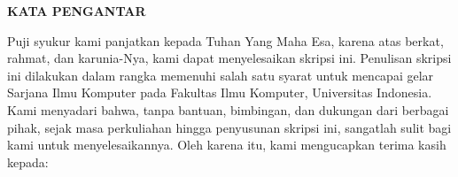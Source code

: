 \documentclass[../../thesis]{subfiles}
\begin{document}
{}
\begin{center}\bfseries KATA PENGANTAR\end{center}
\thispagestyle{plain}
\vspace{0.8cm}

\noindent Puji syukur kami panjatkan kepada Tuhan Yang Maha Esa, karena atas
berkat, rahmat, dan karunia-Nya, kami dapat menyelesaikan skripsi ini.
Penulisan skripsi ini dilakukan dalam rangka memenuhi salah satu syarat untuk
mencapai gelar Sarjana Ilmu Komputer pada Fakultas Ilmu Komputer, Universitas
Indonesia. Kami menyadari bahwa, tanpa bantuan, bimbingan, dan dukungan dari
berbagai pihak, sejak masa perkuliahan hingga penyusunan skripsi ini,
sangatlah sulit bagi kami untuk menyelesaikannya. Oleh karena itu, kami
mengucapkan terima kasih kepada:
\end{document}
